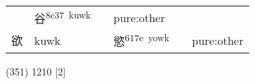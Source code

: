 \documentclass[14pt,a4paper]{scrartcl}
\begin{document}
\begin{longtable}[c]{@{}llllll@{}}
\begin{minipage}[t]{0.14\columnwidth}\raggedright\strut
\strut\end{minipage} &
\begin{minipage}[t]{0.14\columnwidth}\raggedright\strut
谷\textsuperscript{8c37~kuwk}
\strut\end{minipage} &
\begin{minipage}[t]{0.14\columnwidth}\raggedright\strut
\strut\end{minipage} &
\begin{minipage}[t]{0.14\columnwidth}\raggedright\strut
pure:other
\strut\end{minipage}\tabularnewline
\begin{minipage}[t]{0.14\columnwidth}\raggedright\strut
欲
\strut\end{minipage} &
\begin{minipage}[t]{0.14\columnwidth}\raggedright\strut
kuwk
\strut\end{minipage} &
\begin{minipage}[t]{0.14\columnwidth}\raggedright\strut
\strut\end{minipage} &
\begin{minipage}[t]{0.14\columnwidth}\raggedright\strut
慾\textsuperscript{617e~yowk}
\strut\end{minipage} &
\begin{minipage}[t]{0.14\columnwidth}\raggedright\strut
\strut\end{minipage} &
\begin{minipage}[t]{0.14\columnwidth}\raggedright\strut
pure:other
\strut\end{minipage}\tabularnewline
\bottomrule
\end{longtable}

(351) 1210 {[}2{]}
\end{document}
